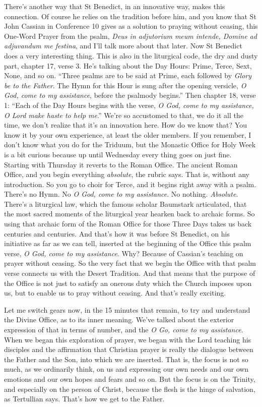 There's another way that St Benedict, in an innovative way, makes this connection. Of course he relies on the tradition before him, and you know that St John Cassian in Conference 10 gives as a solution to praying without ceasing, this One-Word Prayer from the psalm, \emph{Deus in adjutorium meum intende, Domine ad adjuvandum me festina}, and I'll talk more about that later. Now St Benedict does a very interesting thing. This is also in the liturgical code, the dry and dusty part, chapter 17, verse 3. He's talking about the Day Hours: Prime, Terce, Sext, None, and so on. ``Three psalms are to be said at Prime, each followed by \emph{Glory be to the Father}. The Hymn for this Hour is sung after the opening versicle, \emph{O God, come to my assistance}, before the psalmody begins.'' Then chapter 18, verse 1: ``Each of the Day Hours begins with the verse, \emph{O God, come to my assistance, O Lord make haste to help me}.'' We're so accustomed to that, we do it all the time, we don't realize that it's an innovation here. How do we know that? You know it by your own experience, at least the older members. If you remember, I don't know what you do for the Triduum, but the Monastic Office for Holy Week is a bit curious because up until Wednesday every thing goes on just fine. Starting with Thursday it reverts to the Roman Office. The ancient Roman Office, and you begin everything \emph{absolute}, the rubric says. That is, without any introduction. So you go to choir for Terce, and it begins right away with a psalm. There's no Hymn. No \emph{O God, come to my assistance}. No nothing. \emph{Absolute}. There's a liturgical law, which the famous scholar Baumstark articulated, that the most sacred moments of the liturgical year hearken back to archaic forms. So using that archaic form of the Roman Office for those Three Days takes us back centuries and centuries. And that's how it was before St Benedict, on his initiative as far as we can tell, inserted at the beginning of the Office this psalm verse, \emph{O God, come to my assistance}. Why? Because of Cassian's teaching on prayer without ceasing. So the very fact that we begin the Office with that psalm verse connects us with the Desert Tradition. And that means that the purpose of the Office is not just to satisfy an onerous duty which the Church imposes upon us, but to enable us to pray without ceasing. And that's really exciting.

Let me switch gears now, in the 15 minutes that remain, to try and understand the Divine Office, as to its inner meaning. We've talked about the exterior expression of that in terms of number, and the \emph{O Go, come to my assistance}. When we began this exploration of prayer, we began with the Lord teaching his disciples and the affirmation that Christian prayer is really the dialogue between the Father and the Son, into which we are inserted. That is, the focus is not so much, as we ordinarily think, on us and expressing our own needs and our own emotions and our own hopes and fears and so on. But the focus is on the Trinity, and especially on the person of Christ, because the flesh is the hinge of salvation, as Tertullian says. That's how we get to the Father.

